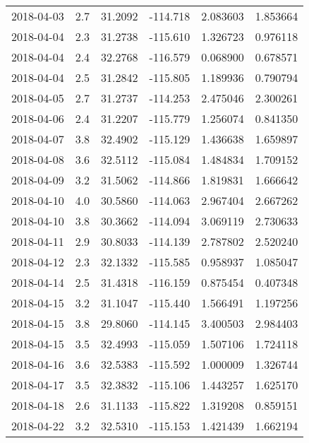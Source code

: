 \begin{tabular}{lrrrrr}
2018-04-03 &       2.7 &  31.2092 &  -114.718 &         2.083603 &         1.853664 \\
2018-04-04 &       2.3 &  31.2738 &  -115.610 &         1.326723 &         0.976118 \\
2018-04-04 &       2.4 &  32.2768 &  -116.579 &         0.068900 &         0.678571 \\
2018-04-04 &       2.5 &  31.2842 &  -115.805 &         1.189936 &         0.790794 \\
2018-04-05 &       2.7 &  31.2737 &  -114.253 &         2.475046 &         2.300261 \\
2018-04-06 &       2.4 &  31.2207 &  -115.779 &         1.256074 &         0.841350 \\
2018-04-07 &       3.8 &  32.4902 &  -115.129 &         1.436638 &         1.659897 \\
2018-04-08 &       3.6 &  32.5112 &  -115.084 &         1.484834 &         1.709152 \\
2018-04-09 &       3.2 &  31.5062 &  -114.866 &         1.819831 &         1.666642 \\
2018-04-10 &       4.0 &  30.5860 &  -114.063 &         2.967404 &         2.667262 \\
2018-04-10 &       3.8 &  30.3662 &  -114.094 &         3.069119 &         2.730633 \\
2018-04-11 &       2.9 &  30.8033 &  -114.139 &         2.787802 &         2.520240 \\
2018-04-12 &       2.3 &  32.1332 &  -115.585 &         0.958937 &         1.085047 \\
2018-04-14 &       2.5 &  31.4318 &  -116.159 &         0.875454 &         0.407348 \\
2018-04-15 &       3.2 &  31.1047 &  -115.440 &         1.566491 &         1.197256 \\
2018-04-15 &       3.8 &  29.8060 &  -114.145 &         3.400503 &         2.984403 \\
2018-04-15 &       3.5 &  32.4993 &  -115.059 &         1.507106 &         1.724118 \\
2018-04-16 &       3.6 &  32.5383 &  -115.592 &         1.000009 &         1.326744 \\
2018-04-17 &       3.5 &  32.3832 &  -115.106 &         1.443257 &         1.625170 \\
2018-04-18 &       2.6 &  31.1133 &  -115.822 &         1.319208 &         0.859151 \\
2018-04-22 &       3.2 &  32.5310 &  -115.153 &         1.421439 &         1.662194 \\

\end{tabular}
